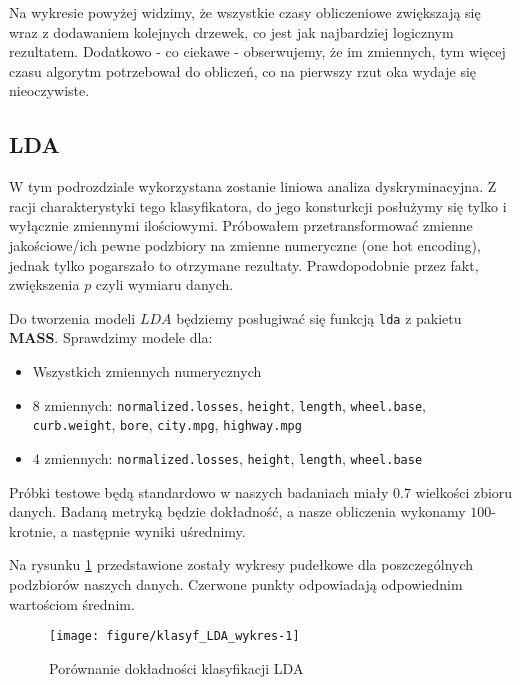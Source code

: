 \documentclass[12pt, a4paper]{article}\usepackage[]{graphicx}\usepackage[]{xcolor}
\makeatletter
\def\maxwidth{ %
  \ifdim\Gin@nat@width>\linewidth
    \linewidth
  \else
    \Gin@nat@width
  \fi
}
\newenvironment{knitrout}{}{} %
\makeatother
\begin{document}
Na wykresie powyżej widzimy, że wszystkie czasy obliczeniowe zwiększają się wraz z dodawaniem kolejnych drzewek, co jest jak najbardziej logicznym rezultatem. Dodatkowo - co ciekawe - obserwujemy, że im zmiennych, tym więcej czasu algorytm potrzebował do obliczeń, co na pierwszy rzut oka wydaje się nieoczywiste.




\subsection{LDA}

\par
W tym podrozdziale wykorzystana zostanie liniowa analiza dyskryminacyjna. Z racji charakterystyki tego klasyfikatora, do jego konsturkcji posłużymy się tylko i wyłącznie zmiennymi ilościowymi. Próbowałem przetransformować zmienne jakościowe/ich pewne podzbiory na zmienne numeryczne (one hot encoding), jednak tylko pogarszało to otrzymane rezultaty. Prawdopodobnie przez fakt, zwiększenia $p$ czyli wymiaru danych.

\par
Do tworzenia modeli $LDA$ będziemy posługiwać się funkcją \texttt{lda} z pakietu \textbf{MASS}. Sprawdzimy modele dla:
\begin{itemize}
\item Wszystkich zmiennych numerycznych
\item $8$ zmiennych: \texttt{normalized.losses}, \texttt{height}, \texttt{length}, \texttt{wheel.base}, \texttt{curb.weight}, \texttt{bore}, \texttt{city.mpg}, \texttt{highway.mpg}
\item $4$ zmiennych: \texttt{normalized.losses}, \texttt{height}, \texttt{length}, \texttt{wheel.base}
\end{itemize}
Próbki testowe będą standardowo w naszych badaniach miały $0.7$ wielkości zbioru danych. Badaną metryką będzie dokładność, a nasze obliczenia wykonamy $100$-krotnie, a następnie wyniki uśrednimy.



Na rysunku \ref{fig:klasyf_LDA_wykres} przedstawione zostały wykresy pudełkowe dla poszczególnych podzbiorów naszych danych. Czerwone punkty odpowiadają odpowiednim wartościom średnim.

\begin{knitrout}
\color{fgcolor}\begin{figure}[H]

{\centering \texttt{[image: figure/klasyf\_LDA\_wykres-1]} 

}

\caption[Porównanie dokładności klasyfikacji LDA]{Porównanie dokładności klasyfikacji LDA}\label{fig:klasyf_LDA_wykres}
\end{figure}

\end{knitrout}
\end{document}
